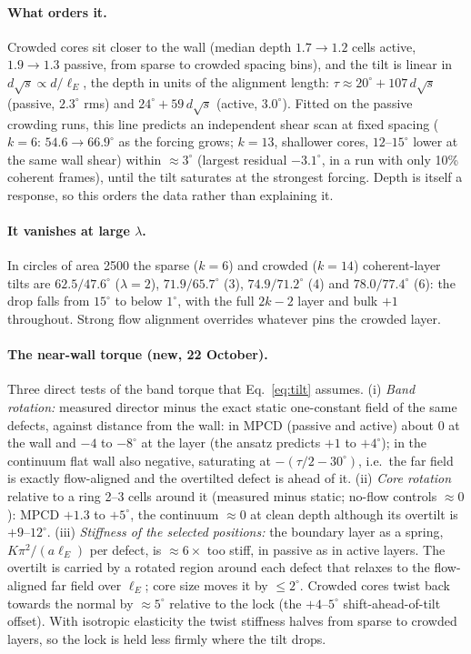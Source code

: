 \documentclass[11pt,a4paper]{article}
\begin{document}
\paragraph{What orders it.} Crowded cores sit closer to the wall (median depth $1.7\to1.2$ cells active, $1.9\to1.3$ passive, from sparse to crowded spacing bins), and the tilt is linear in $d\sqrt{s}\propto d/\ell_E$, the depth in units of the
alignment length: $\tau\approx20^\circ+107\,d\sqrt{s}$ (passive, $2.3^\circ$ rms) and $24^\circ+59\,d\sqrt{s}$ (active, $3.0^\circ$). Fitted on the passive crowding runs, this line predicts
an independent shear scan at fixed spacing ($k=6$: $54.6\to66.9^\circ$ as the forcing grows; $k=13$, shallower cores, $12$--$15^\circ$ lower at the same wall shear) within $\approx3^\circ$ (largest residual $-3.1^\circ$, in a run with only 10\% coherent frames), until
the tilt saturates at the strongest forcing. Depth is itself a response, so this orders the data rather than explaining it.

\paragraph{It vanishes at large $\lambda$.} In circles of area 2500 the sparse ($k=6$) and crowded ($k=14$) coherent-layer tilts are $62.5/47.6^\circ$ ($\lambda=2$), $71.9/65.7^\circ$ (3),
$74.9/71.2^\circ$ (4) and $78.0/77.4^\circ$ (6): the drop falls from $15^\circ$ to below $1^\circ$, with the full $2k-2$ layer and bulk $+1$ throughout. Strong flow alignment overrides whatever
pins the crowded layer.

\paragraph{The near-wall torque (new, 22 October).} Three direct tests of the band torque that Eq.~\eqref{eq:tilt} assumes. (i) \emph{Band rotation:} measured director minus
the exact static one-constant field of the same defects, against distance from the wall: in MPCD (passive and active) about 0 at the wall and $-4$ to $-8^\circ$ at the layer
(the ansatz predicts $+1$ to $+4^\circ$); in the continuum flat wall also negative, saturating at $-(\tau/2-30^\circ)$, i.e.\ the far field is exactly flow-aligned and the
overtilted defect is ahead of it. (ii) \emph{Core rotation} relative to a ring 2--3 cells around it (measured minus static; no-flow controls $\approx0$): MPCD $+1.3$ to $+5^\circ$,
the continuum $\approx0$ at clean depth although its overtilt is $+9$--$12^\circ$. (iii) \emph{Stiffness of the selected positions:} the boundary layer as a spring,
$K\pi^2/(a\ell_E)$ per defect, is $\approx6\times$ too stiff, in passive as in active layers. The overtilt is carried by a rotated region around each defect that relaxes to
the flow-aligned far field over $\ell_E$; core size moves it by $\le2^\circ$. Crowded cores twist back towards the normal by $\approx5^\circ$ relative to the lock (the
$+4$--$5^\circ$ shift-ahead-of-tilt offset). With isotropic elasticity the twist stiffness halves from sparse to crowded layers, so the lock is held less firmly where the
tilt drops.
\end{document}
